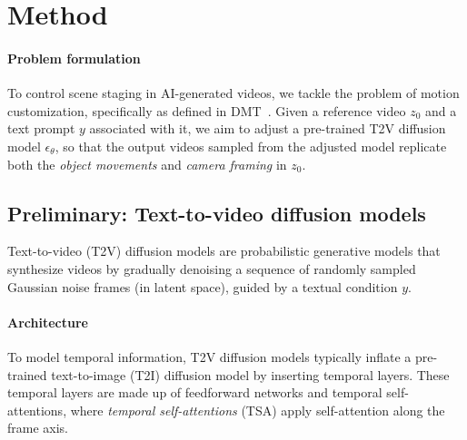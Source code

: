 \section{Method}
\label{sec:method}



\paragraph{Problem formulation}
To control scene staging in AI-generated videos, we tackle the problem of motion customization, specifically as defined in DMT~\cite{dmt}. Given a reference video $z_0$ and a text prompt $y$ associated with it, we aim to adjust a pre-trained T2V diffusion model $\epsilon_{\theta}$, so that the output videos sampled from the adjusted model replicate both the \emph{object movements} and \emph{camera framing} in $z_0$.

\subsection{Preliminary: Text-to-video diffusion models}

Text-to-video (T2V) diffusion models are probabilistic generative models that synthesize videos by gradually denoising a sequence of randomly sampled Gaussian noise frames (in latent space), guided by a textual condition $y$.

\paragraph{Architecture}
To model temporal information, T2V diffusion models typically inflate a pre-trained text-to-image (T2I) diffusion model by inserting temporal layers. These temporal layers are made up of feedforward networks and temporal self-attentions, where \emph{temporal self-attentions} (TSA) apply self-attention along the frame axis.

